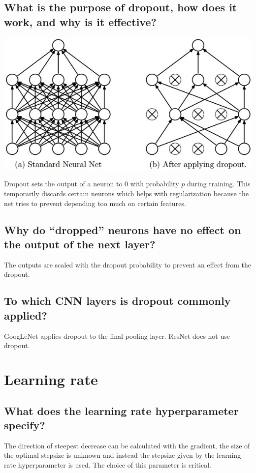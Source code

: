 \subsection{What is the purpose of dropout, how does it work, and why is it effective?}
\begin{minipage}{0.4\textwidth}
\includegraphics[width=\textwidth]{./img/dropout.jpeg}
\end{minipage}
\begin{minipage}{0.6\textwidth}
Dropout sets the output of a neuron to 0 with probability $p$ during training. This temporarily discards certain neurons which helps with regularization because the net tries to prevent depending too much on certain features. 
\end{minipage}
\subsection{Why do ``dropped'' neurons have no effect on the output of the next layer?}
The outputs are scaled with the dropout probability to prevent an effect from the dropout.
\subsection{To which CNN layers is dropout commonly applied?}
GoogLeNet applies dropout to the final pooling layer. ResNet does not use dropout. 
%
%
\section{Learning rate}
\subsection{What does the learning rate hyperparameter specify?}
The direction of steepest decrease can be calculated with the gradient, the size of the optimal stepsize is unknown and instead the stepsize given by the learning rate hyperparameter is used. The choice of this parameter is critical. 

